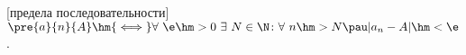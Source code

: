 [предела последовательности]$\pre{a}{n}{A} \hm{\iff} \forall\  \e\hm>0\ \exists\  N\in\N\colon \forall\  n\hm>N\pau |a_n-A|\hm<\e$.
